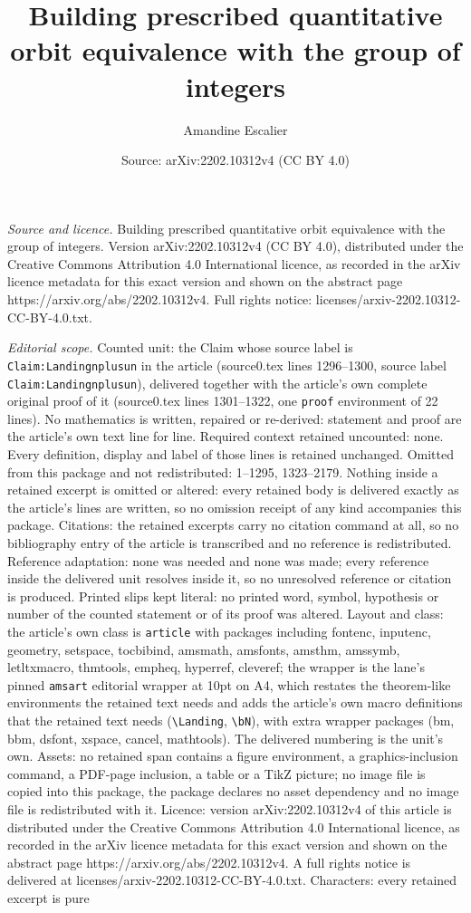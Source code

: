\documentclass[10pt,a4paper]{amsart}
\title[Building prescribed quantitative orbit equivalence with the ]{Building prescribed quantitative orbit equivalence with the group of integers}
\author{Amandine Escalier}
\date{Source: arXiv:2202.10312v4 (CC BY 4.0)}
\begin{document}
\maketitle

\noindent\emph{Source and licence.} Building prescribed quantitative orbit equivalence with the group of integers. Version arXiv:2202.10312v4 (CC BY 4.0), distributed under the Creative Commons Attribution 4.0 International licence, as recorded in the arXiv licence metadata for this exact version and shown on the abstract page https://arxiv.org/abs/2202.10312v4. Full rights notice: licenses/arxiv-2202.10312-CC-BY-4.0.txt.\par\smallskip

\noindent\textit{Editorial scope.} Counted unit: the Claim whose source label is \texttt{Claim:Landingnplusun} in the article (source0.tex lines 1296--1300, source label \texttt{Claim:Landingnplusun}), delivered together with the article's own complete original proof of it (source0.tex lines 1301--1322, one \texttt{proof} environment of 22 lines). No mathematics is written, repaired or re-derived: statement and proof are the article's own text line for line. Required context retained uncounted: none. Every definition, display and label of those lines is retained unchanged. Omitted from this package and not redistributed: 1--1295, 1323--2179. Nothing inside a retained excerpt is omitted or altered: every retained body is delivered exactly as the article's lines are written, so no omission receipt of any kind accompanies this package. Citations: the retained excerpts carry no citation command at all, so no bibliography entry of the article is transcribed and no reference is redistributed. Reference adaptation: none was needed and none was made; every reference inside the delivered unit resolves inside it, so no unresolved reference or citation is produced. Printed slips kept literal: no printed word, symbol, hypothesis or number of the counted statement or of its proof was altered. Layout and class: the article's own class is \texttt{article} with packages including fontenc, inputenc, geometry, setspace, tocbibind, amsmath, amsfonts, amsthm, amssymb, letltxmacro, thmtools, empheq, hyperref, cleveref; the wrapper is the lane's pinned \texttt{amsart} editorial wrapper at 10pt on A4, which restates the theorem-like environments the retained text needs and adds the article's own macro definitions that the retained text needs (\texttt{\textbackslash Landing}, \texttt{\textbackslash bN}), with extra wrapper packages (bm, bbm, dsfont, xspace, cancel, mathtools). The delivered numbering is the unit's own. Assets: no retained span contains a figure environment, a graphics-inclusion command, a PDF-page inclusion, a table or a TikZ picture; no image file is copied into this package, the package declares no asset dependency and no image file is redistributed with it. Licence: version arXiv:2202.10312v4 of this article is distributed under the Creative Commons Attribution 4.0 International licence, as recorded in the arXiv licence metadata for this exact version and shown on the abstract page https://arxiv.org/abs/2202.10312v4. A full rights notice is delivered at licenses/arxiv-2202.10312-CC-BY-4.0.txt. Characters: every retained excerpt is pure 
\end{document}
